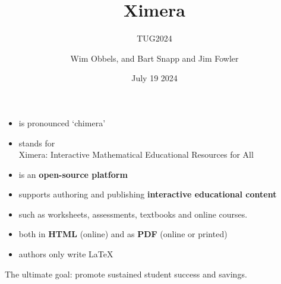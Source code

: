 \title{Ximera}
\subtitle{TUG2024}
\author{Wim Obbels, and Bart Snapp and Jim Fowler}
\date{July 19 2024}

\usepackage{rawfonts}
%
%
%

\graphicspath{
	{../../}
	{../}
	{./}
  	{../../pictures/}
   	{../pictures/}
   	{./pictures/}
}






\begin{frame}
  \titlepage
\end{frame}


\begin{frame}[t]{\Large{}}
  \p
  \begin{itemize}[<+->]
  \item is pronounced \lq chimera\rq
  \item stands for 
      \\[0.5cm]
     {\Large\blue X}imera: {\Large\blue I}nteractive {\Large\blue M}athematical {\Large\blue E}ducational {\Large\blue R}esources for {\Large\blue A}ll
     \\[0.4cm]
  \item is an \textbf{open-source platform}
  \item supports authoring and publishing \textbf{interactive educational content}
  \item such as worksheets, assessments, textbooks and online courses. 
  \item both in \textbf{HTML} (online) and as \textbf{PDF} (online or printed)
  \item authors only write \LaTeX %
  \end{itemize}
   
  \vfill

  \p The ultimate goal: promote sustained student success and savings.
  
  

\end{frame}


